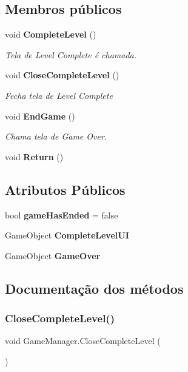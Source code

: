 \subsection*{Membros públicos}
\begin{DoxyCompactItemize}
\item 
void \textbf{ Complete\+Level} ()
\begin{DoxyCompactList}\small\item\em Tela de \textquotesingle{}Level Complete\textquotesingle{} é chamada. \end{DoxyCompactList}\item 
void \textbf{ Close\+Complete\+Level} ()
\begin{DoxyCompactList}\small\item\em Fecha tela de \textquotesingle{}Level Complete\textquotesingle{} \end{DoxyCompactList}\item 
void \textbf{ End\+Game} ()
\begin{DoxyCompactList}\small\item\em Chama tela de \textquotesingle{}Game Over\textquotesingle{}. \end{DoxyCompactList}\item 
void \textbf{ Return} ()
\end{DoxyCompactItemize}
\subsection*{Atributos Públicos}
\begin{DoxyCompactItemize}
\item 
bool \textbf{ game\+Has\+Ended} = false
\item 
Game\+Object \textbf{ Complete\+Level\+UI}
\item 
Game\+Object \textbf{ Game\+Over}
\end{DoxyCompactItemize}


\subsection{Documentação dos métodos}
\mbox{\label{class_game_manager_ae7ca31f79eef5dfa0dd3ebac36cfdc39}} 
\subsubsection{CloseCompleteLevel()}
{\footnotesize\ttfamily void Game\+Manager.\+Close\+Complete\+Level (\begin{DoxyParamCaption}{ }\end{DoxyParamCaption})}



